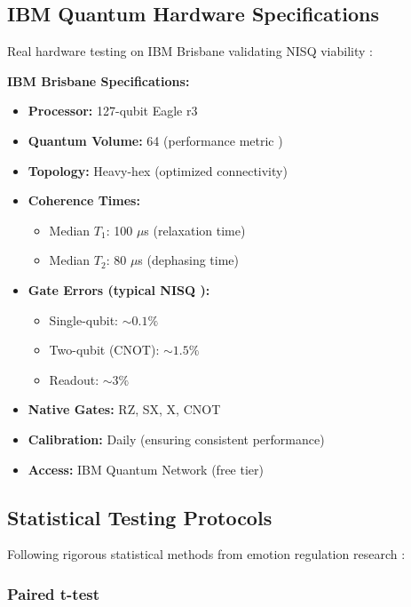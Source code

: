 \documentclass[11pt,letterpaper]{article}
\begin{document}
\subsection{IBM Quantum Hardware Specifications}

Real hardware testing on IBM Brisbane validating NISQ viability \cite{preskill2018quantum}:

\textbf{IBM Brisbane Specifications:}
\begin{itemize}
\item \textbf{Processor:} 127-qubit Eagle r3
\item \textbf{Quantum Volume:} 64 (performance metric \cite{preskill2018quantum})
\item \textbf{Topology:} Heavy-hex (optimized connectivity)
\item \textbf{Coherence Times:}
\begin{itemize}
\item Median $T_1$: 100 $\mu$s (relaxation time)
\item Median $T_2$: 80 $\mu$s (dephasing time)
\end{itemize}
\item \textbf{Gate Errors (typical NISQ \cite{preskill2018quantum}):}
\begin{itemize}
\item Single-qubit: $\sim 0.1\%$
\item Two-qubit (CNOT): $\sim 1.5\%$
\item Readout: $\sim 3\%$
\end{itemize}
\item \textbf{Native Gates:} RZ, SX, X, CNOT
\item \textbf{Calibration:} Daily (ensuring consistent performance)
\item \textbf{Access:} IBM Quantum Network (free tier)
\end{itemize}

\subsection{Statistical Testing Protocols}

Following rigorous statistical methods from emotion regulation research \cite{gross1998antecedent,keng2011effect}:

\subsubsection{Paired t-test}
\end{document}
